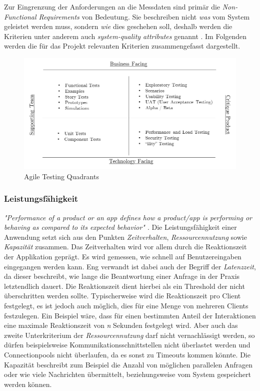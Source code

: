 Zur Eingrenzung der Anforderungen an die Messdaten sind primär die \emph{Non-Functional Requirements} von Bedeutung. Sie beschreiben nicht \emph{was} vom System geleistet werden muss, sondern \emph{wie} dies geschehen soll, deshalb werden die Kriterien unter anderem auch \emph{system-quality attributes} genannt \cite[Seite~335]{continuous-delivery}. Im Folgenden werden die für das Projekt relevanten Kriterien zusammengefasst dargestellt.

\begin{figure}[h!]
	\centering
	\includegraphics[width=\linewidth]{kapitel/vorgehensmodell/kriterienkatalog/_img/agile-testing-quadrants}
	\caption[Agile Testing Quadrants]{Agile Testing Quadrants}
	\label{fig:testing-quad}
\end{figure}




\subsubsection{Leistungsfähigkeit}

\emph{"Performance of a product or an app defines how a product/app is performing or behaving as compared to its expected behavior" \cite{nfr-dotnetcurry}}. Die Leistungsfähigkeit einer Anwendung setzt sich aus den Punkten \emph{Zeitverhalten}, \emph{Ressourcennutzung} sowie \emph{Kapazität} zusammen. Das Zeitverhalten wird vor allem durch die Reaktionszeit der Applikation geprägt. Es wird gemessen, wie schnell auf Benutzereingaben eingegangen werden kann. Eng verwandt ist dabei auch der Begriff der \emph{Latenzzeit}, da dieser beschreibt, wie lange die Beantwortung einer Anfrage in der Praxis letztendlich dauert. Die Reaktionszeit dient hierbei als ein Threshold der nicht überschritten werden sollte. Typischerweise wird die Reaktionszeit pro Client festgelegt, es ist jedoch auch möglich, dies für eine Menge von mehreren Clients festzulegen. Ein Beispiel wäre, dass für einen bestimmten Anteil der Interaktionen eine maximale Reaktionszeit von \emph{n} Sekunden festgelegt wird. Aber auch das zweite Unterkriterium der \emph{Ressourcennutzung} darf nicht vernachlässigt werden, so dürfen beispielsweise Kommunikationsschnittstellen nicht überlastet werden und Connectionpools nicht überlaufen, da es sonst zu Timeouts kommen könnte. Die Kapazität beschreibt zum Beispiel die Anzahl von möglichen parallelen Anfragen oder wie viele Nachrichten übermittelt, beziehungsweise vom System gespeichert werden können. 

